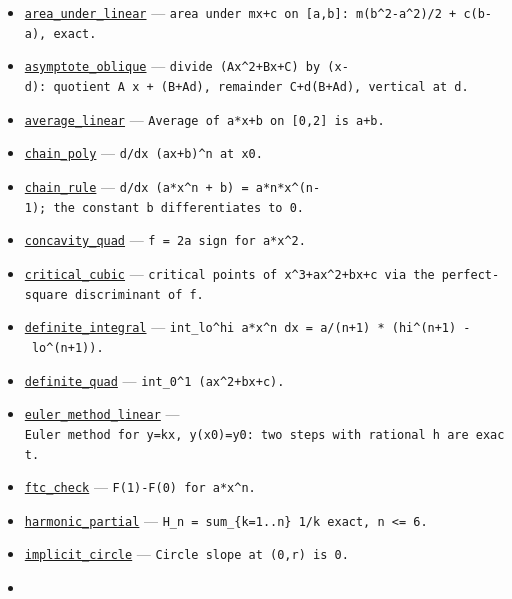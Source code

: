 \documentclass[
  10pt,
]{article}
\providecommand{\tightlist}{%
  \setlength{\itemsep}{0pt}\setlength{\parskip}{0pt}}
\begin{document}
\begin{itemize}
\tightlist
\item
  \href{../generation_1/I3/algos_i3.py}{\texttt{area\_under\_linear}}
  ---
  \texttt{area\ under\ mx+c\ on\ {[}a,b{]}:\ m(b\^{}2-a\^{}2)/2\ +\ c(b-a),\ exact.}
\item
  \href{../generation_1/I3/algos_i3.py}{\texttt{asymptote\_oblique}} ---
  \texttt{divide\ (Ax\^{}2+Bx+C)\ by\ (x-d):\ quotient\ A\ x\ +\ (B+Ad),\ remainder\ C+d(B+Ad),\ vertical\ at\ d.}
\item
  \href{../generation_1/I1/algos_gen1_big.py}{\texttt{average\_linear}}
  --- \texttt{Average\ of\ a*x+b\ on\ {[}0,2{]}\ is\ a+b.}
\item
  \href{../generation_1/I1/algos_gen1_big.py}{\texttt{chain\_poly}} ---
  \texttt{d/dx\ (ax+b)\^{}n\ at\ x0.}
\item
  \href{../tools/prm/algos.py}{\texttt{chain\_rule}} ---
  \texttt{d/dx\ (a*x\^{}n\ +\ b)\ =\ a*n*x\^{}(n-1);\ the\ constant\ b\ differentiates\ to\ 0.}
\item
  \href{../generation_1/I1/algos_gen1_big.py}{\texttt{concavity\_quad}}
  ---
  \texttt{f\textquotesingle{}\textquotesingle{}\ =\ 2a\ sign\ for\ a*x\^{}2.}
\item
  \href{../generation_1/I3/algos_i3.py}{\texttt{critical\_cubic}} ---
  \texttt{critical\ points\ of\ x\^{}3+ax\^{}2+bx+c\ via\ the\ perfect-square\ discriminant\ of\ f\textquotesingle{}.}
\item
  \href{../tools/prm/algos.py}{\texttt{definite\_integral}} ---
  \texttt{int\_lo\^{}hi\ a*x\^{}n\ dx\ =\ a/(n+1)\ *\ (hi\^{}(n+1)\ -\ lo\^{}(n+1)).}
\item
  \href{../generation_1/I1/algos_gen1_big.py}{\texttt{definite\_quad}}
  --- \texttt{int\_0\^{}1\ (ax\^{}2+bx+c).}
\item
  \href{../generation_1/I3/algos_i3.py}{\texttt{euler\_method\_linear}}
  ---
  \texttt{Euler\ method\ for\ y\textquotesingle{}=kx,\ y(x0)=y0:\ two\ steps\ with\ rational\ h\ are\ exact.}
\item
  \href{../generation_1/I1/algos_gen1_big.py}{\texttt{ftc\_check}} ---
  \texttt{F(1)-F(0)\ for\ a*x\^{}n.}
\item
  \href{../generation_1/I1/algos_gen1_ext.py}{\texttt{harmonic\_partial}}
  ---
  \texttt{H\_n\ =\ sum\_\{k=1..n\}\ 1/k\ exact,\ n\ \textless{}=\ 6.}
\item
  \href{../generation_1/I1/algos_gen1_big.py}{\texttt{implicit\_circle}}
  --- \texttt{Circle\ slope\ at\ (0,r)\ is\ 0.}
\item

\end{itemize}
\end{document}

